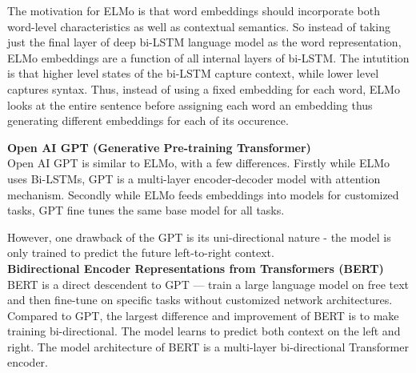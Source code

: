 The motivation for ELMo is that word embeddings should incorporate both word-level characteristics as well as contextual semantics. So instead of taking just the final layer of deep bi-LSTM language model as the word representation, ELMo embeddings are a function of all internal layers of bi-LSTM. The intutition is that higher level states of the bi-LSTM capture context, while lower level captures syntax. Thus, instead of using a fixed embedding for each word, ELMo looks at the entire sentence before assigning each word an embedding thus generating different embeddings for each of its occurence.

\newpage
\noindent \textbf{Open AI GPT (Generative Pre-training Transformer)}\\

Open AI GPT is similar to ELMo, with a few differences. Firstly while ELMo uses Bi-LSTMs, GPT is a multi-layer encoder-decoder model with attention mechanism. Secondly while ELMo feeds embeddings into models for customized tasks, GPT fine tunes the same base model for all tasks.

However, one drawback of the GPT is its uni-directional nature - the model is only trained to predict the future left-to-right context.\\

\noindent \textbf{Bidirectional Encoder Representations from Transformers (BERT)}\\

BERT is a direct descendent to GPT — train a large language model on free text and then fine-tune on specific tasks without customized network architectures. Compared to GPT, the largest difference and improvement of BERT is to make training bi-directional. The model learns to predict both context on the left and right. The model architecture of BERT is a multi-layer bi-directional Transformer encoder.